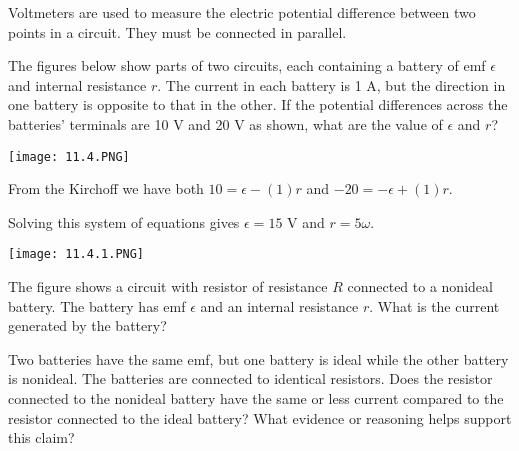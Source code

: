 \documentclass[../em.tex]{subfiles}
\begin{document}
Voltmeters are used to measure the electric potential difference between two points in a circuit. They must be connected in parallel.

\begin{example}
    The figures below show parts of two circuits, each containing a battery of emf $\epsilon$ and internal resistance $r$. The current in each battery is 1 A, but the direction in one battery 
    is opposite to that in the other. If the potential differences across the batteries' terminals are 10 V and 20 V as shown, what are the value of $\epsilon$ and $r$?

    \begin{center}
        \texttt{[image: 11.4.PNG]}
    \end{center}

    From the Kirchoff we have both $10=\epsilon-(1)r$ and $-20=-\epsilon+(1)r$.

    Solving this system of equations gives $\epsilon = 15$ V and $r = 5 \omega$.   
\end{example}

\ex \begin{center}
    \texttt{[image: 11.4.1.PNG]}
\end{center}
The figure shows a circuit with resistor of resistance $R$ connected to a nonideal battery. The battery has emf $\epsilon$ and an internal resistance $r$. What is the current generated by the battery?

\ex Two batteries have the same emf, but one battery is ideal while the other battery is nonideal. The batteries are connected to identical resistors. Does the resistor connected to the nonideal battery 
have the same or less current compared to the resistor connected to the ideal battery? What evidence or reasoning helps support this claim?
\end{document}
